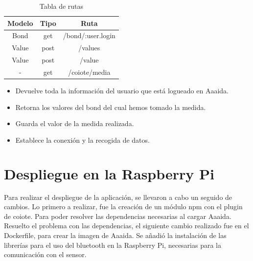 \begin{table}[htb]

\begin{center}

\begin{tabular}{|c|c|c|}

\hline

{\bf Modelo} & {\bf Tipo} &

{\bf Ruta} \\ \hline \hline

Bond & get & /bond/:user.login  \\ \hline

Value & post & /values \\ \hline

Value & post & /value \\ \hline

- & get & /coiote/media \\ \hline

\end{tabular}

\caption{Tabla de rutas}

\label{T:prova}

\end{center}

\end{table}

\begin{itemize}
\item Devuelve toda la información del usuario que está logueado en Aaaida.
\item Retorna los valores del bond del cual hemos tomado la medida.
\item Guarda el valor de la medida realizada. 
\item Establece la conexión y la recogida de datos.
\end{itemize}

\section{Despliegue en la Raspberry Pi}

Para realizar el despliegue de la aplicación, se llevaron a cabo un seguido de cambios. 
Lo primero a realizar, fue la creación de un módulo npm con el plugin de coiote. Para poder resolver las dependencias necesarias al cargar Aaaida.
Resuelto el problema con las dependencias, el siguiente cambio realizado fue en el Dockerfile, para crear la imagen de Aaaida. Se añadió la instalación de las librerías para el uso del bluetooth en la Raspberry Pi, necesarias para la comunicación con el sensor.
 
